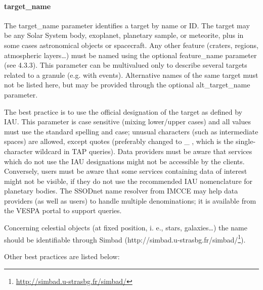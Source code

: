 \documentclass[11pt,a4paper]{ivoa}
\begin{document}
\paragraph{target\_name}

The target\_name parameter identifies a target by name or ID. The target may be any Solar System body, exoplanet, planetary sample, or meteorite, plus in some cases astronomical objects or spacecraft. Any other feature (craters, regions, atmospheric layers…) must be named using the optional feature\_name parameter (see 4.3.3). This parameter can be multivalued only to describe several targets related to a granule (e.g. with events). Alternative names of the same target must not be listed here, but may be provided through the optional alt\_target\_name parameter. 

The best practice is to use the official designation of the target as defined by IAU. This parameter is case sensitive (mixing lower/upper cases) and all values must use the standard spelling and case; unusual characters (such as intermediate spaces) are allowed, except quotes (preferably changed to \_ , which is the single-character wildcard in TAP queries). Data providers must be aware that services which do not use the IAU designations might not be accessible by the clients. Conversely, users must be aware that some services containing data of interest might not be visible, if they do not use the recommended IAU nomenclature for planetary bodies. The SSODnet name resolver from IMCCE may help data providers (as well as users) to handle multiple denominations; it is available from the VESPA portal to support queries.

Concerning celestial objects (at fixed position, i. e., stars, galaxies…) the name should be identifiable through Simbad (http://simbad.u-strasbg.fr/simbad/\footnote{\url{http://simbad.u-strasbg.fr/simbad/}}).

Other best practices are listed below:
\end{document}
